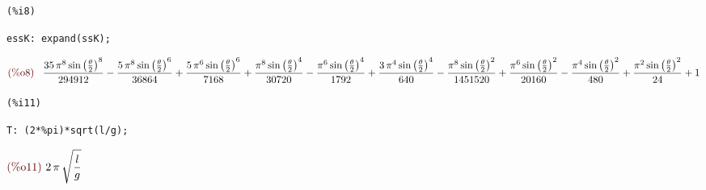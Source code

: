 \documentclass[12pt]{article}
\begin{document}
\noindent
\begin{minipage}[t]{8ex}{\color{red}\bf
\begin{verbatim}
(%i8) 
\end{verbatim}}
\end{minipage}
\begin{minipage}[t]{\textwidth}{\color{blue}
\begin{verbatim}
essK: expand(ssK);
\end{verbatim}}
\end{minipage}
\begin{math}\displaystyle
\parbox{8ex}{\color{labelcolor}(\%o8) }
\frac{35\,{\pi }^{8}\,{\mathrm{sin}\left( \frac{\theta}{2}\right) }^{8}}{294912}-\frac{5\,{\pi }^{8}\,{\mathrm{sin}\left( \frac{\theta}{2}\right) }^{6}}{36864}+\frac{5\,{\pi }^{6}\,{\mathrm{sin}\left( \frac{\theta}{2}\right) }^{6}}{7168}+\frac{{\pi }^{8}\,{\mathrm{sin}\left( \frac{\theta}{2}\right) }^{4}}{30720}-\frac{{\pi }^{6}\,{\mathrm{sin}\left( \frac{\theta}{2}\right) }^{4}}{1792}+\frac{3\,{\pi }^{4}\,{\mathrm{sin}\left( \frac{\theta}{2}\right) }^{4}}{640}-\frac{{\pi }^{8}\,{\mathrm{sin}\left( \frac{\theta}{2}\right) }^{2}}{1451520}+\frac{{\pi }^{6}\,{\mathrm{sin}\left( \frac{\theta}{2}\right) }^{2}}{20160}-\frac{{\pi }^{4}\,{\mathrm{sin}\left( \frac{\theta}{2}\right) }^{2}}{480}+\frac{{\pi }^{2}\,{\mathrm{sin}\left( \frac{\theta}{2}\right) }^{2}}{24}+1
\end{math}

\noindent
\begin{minipage}[t]{8ex}{\color{red}\bf
\begin{verbatim}
(%i11) 
\end{verbatim}}
\end{minipage}
\begin{minipage}[t]{\textwidth}{\color{blue}
\begin{verbatim}
T: (2*%pi)*sqrt(l/g);
\end{verbatim}}
\end{minipage}
\begin{math}\displaystyle
\parbox{8ex}{\color{labelcolor}(\%o11) }
2\,\pi \,\sqrt{\frac{l}{g}}
\end{math}
\end{document}
